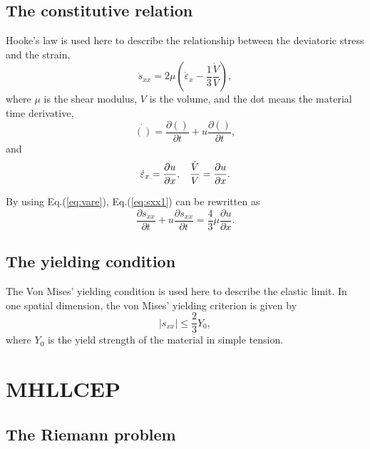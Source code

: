 \documentclass{article}
\numberwithin{equation}{section}
\numberwithin{table}{section}
\begin{document}
\subsection{The constitutive relation}
Hooke's law is used here to describe the relationship between the deviatoric stress and the strain,
\begin{equation}\label{eq:sxx1}
\dot{s}_{xx} = 2\mu \left(\dot{\varepsilon}_x-\frac{1}{3}\frac{\dot{V}}{V}\right),
\end{equation}
where $\mu$ is the shear modulus, $V$ is the volume, and the dot means the material time derivative,
\begin{equation}\label{eq:mt}
  \dot{()} = \frac{\partial ()}{\partial t} + u \frac{\partial ()}{\partial t},
\end{equation}
and
\begin{equation}\label{eq:vare}
  \dot{\varepsilon}_x = \frac{\partial u}{\partial x}, \hspace{0.3cm} \frac{\dot{V}}{V} = \frac{\partial u}{\partial x}.
\end{equation}

By using Eq.(\ref{eq:vare}), Eq.(\ref{eq:sxx1}) can be rewritten as
\begin{equation}\label{eq:sxx}
  \frac{\partial s_{xx}}{\partial t} + u \frac{\partial s_{xx}}{\partial t} =\frac{4}{3}\mu \frac{\partial u}{\partial x}.
\end{equation}

\subsection{The yielding condition}
The Von Mises' yielding condition is used here to describe the elastic limit. In one spatial dimension, the von Mises' yielding criterion is given by
\begin{equation}
  |s_{xx}| \le \frac{2}{3}Y_0,
\end{equation}
where $Y_0$ is the yield strength of the material in simple tension.

\section{MHLLCEP}\label{sec:HLLCEP}
\subsection{The Riemann problem}
\end{document}
